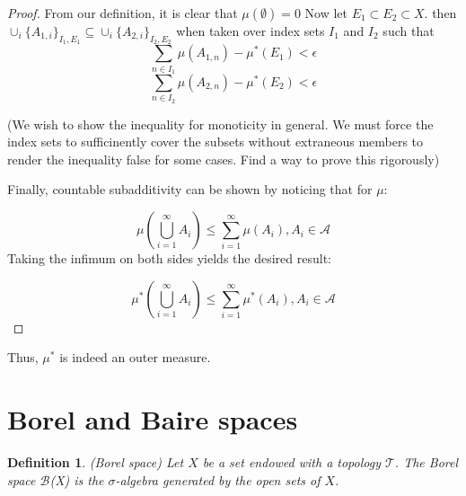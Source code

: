 \documentclass[12pt]{article}
\newtheorem{definition}{Definition}[section]
\theoremstyle{remark}
\begin{document}
\begin{proof}
From our definition, it is clear that $\mu(\emptyset) = 0$
\newline
Now let $E_1 \subset E_2 \subset X$.
then $\cup_i\{A_{1,i}\}_{I_1,E_1} \subseteq \cup_i\{A_{2,i}\}_{I_2,E_2}$ when taken over index sets $I_1$ and $I_2$
such that $$\sum_{n \in I_1} \mu(A_{1,n}) - \mu^*(E_1) < \epsilon$$
$$\sum_{n \in I_2} \mu(A_{2,n}) - \mu^*(E_2) < \epsilon$$

(We wish to show the inequality for monoticity in general. We must force the index sets to sufficinently cover the subsets without extraneous members to render the inequality false for some cases. Find a way to prove this rigorously)

Finally, countable subadditivity can be shown by noticing that for $\mu$:

$$ \mu(\bigcup_{i = 1}^{\infty} A_i) \leq \sum_{i=1}^{\infty} \mu(A_i), A_i \in \mathcal{A} $$
Taking the infimum on both sides yields the desired result:

$$  \mu^*(\bigcup_{i = 1}^{\infty} A_i) \leq \sum_{i=1}^{\infty} \mu^*(A_i), A_i \in \mathcal{A} $$
\end{proof}

Thus, $\mu^*$ is indeed an outer measure.

\section{Borel and Baire spaces}

\begin{definition}(Borel space)
Let $X$ be a set endowed with a topology $\mathcal{T}$. The Borel space $\mathcal{B}$(X) is the $\sigma$-algebra generated by the open sets of $X$.
\end{definition}
\end{document}
